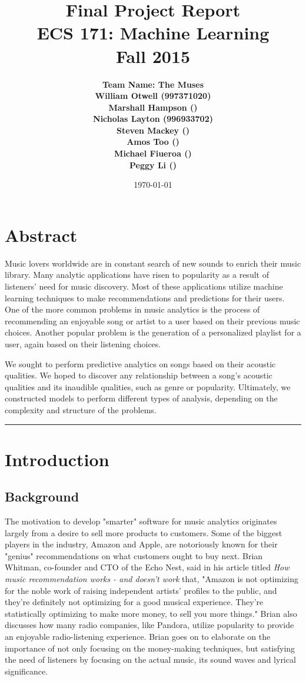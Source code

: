 \documentclass[12pt]{article}
\title{\vspace{-3ex}\bf Final Project Report\\[2ex] 
       \normalsize ECS 171: Machine Learning\\Fall 2015}
\date{\today}
\author{\bf Team Name: The Muses\\ \bf William Otwell (997371020)\\ \bf Marshall Hampson ()\\ \bf Nicholas Layton (996933702)\\ \bf Steven Mackey ()\\ \bf Amos Too ()\\ \bf Michael Fiueroa ()\\ \bf Peggy Li ()}
\newcommand{\horizontalLine}{
	\begin{center}
		\hrule width 1.0\textwidth
	\end{center}
}
\begin{document}
\maketitle
\pagebreak
\tableofcontents
\pagebreak

\section{Abstract}
\label{sec:abstract}
Music lovers worldwide are in constant search of new sounds to enrich their music library. Many analytic applications have risen to popularity as a result of listeners' need for music discovery. Most of these applications utilize machine learning techniques to make recommendations and predictions for their users. One of the more common problems in music analytics is the process of recommending an enjoyable song or artist to a user based on their previous music choices. Another popular problem is the generation of a personalized playlist for a user, again based on their listening choices. 

We sought to perform predictive analytics on songs based on their acoustic qualities. We hoped to discover any relationship between a song's acoustic qualities and its inaudible qualities, such as genre or popularity. Ultimately, we constructed models to perform different types of analysis, depending on the complexity and structure of the problems. 

\horizontalLine
\section{Introduction}
\label{sec:introduction}

\subsection{Background}
\label{subsec:background}
The motivation to develop "smarter" software for music analytics originates largely from a desire to sell more products to customers. Some of the biggest players in the industry, Amazon and Apple, are notoriously known for their "genius" recommendations on what customers ought to buy next. Brian Whitman, co-founder and CTO of the Echo Nest, said in his article titled \textit{How music recommendation works - and doesn't work} that, "Amazon is not optimizing for the noble work of raising independent artists' profiles to the public, and they're definitely not optimizing for a good musical experience. They're statistically optimizing to make more money, to sell you more things." Brian also discusses how many radio companies, like Pandora, utilize popularity to provide an enjoyable radio-listening experience. Brian goes on to elaborate on the importance of not only focusing on the money-making techniques, but satisfying the need of listeners by focusing on the actual music, its sound waves and lyrical significance. 
\end{document}
